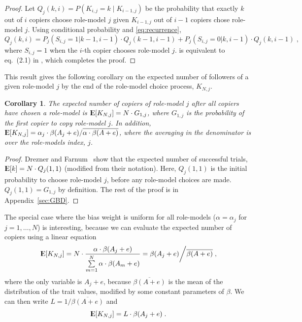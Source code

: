 \documentclass[12pt]{extarticle}
\DeclareMathOperator*{\E}{{\rm I\kern-.3em E}}
\newtheorem{corollary}{Corollary}
\begin{document}
\begin{proof}
{Let} $Q_j(k,i)=P(K_{i,j} = k \mid K_{i-1,j})$ {be} the probability that exactly $k$ out of $i$ copiers choose role-model $j$ given $K_{i-1,j}$ {out} of $i-1$ copiers chose role-model $j$. 
Using conditional probability and \cref{eq:recurrence},
\begin{equation}\label{recursive}
Q_j(k,i) = P_j(S_{i,j}=1 | k-1,i-1) \cdot Q_j(k-1,i-1) + P_j(S_{i,j} =0 | k,i-1) \cdot Q_j(k,i-1) \;,
\end{equation}
where $S_{i,j} =1 $ when the $i$-th copier chooses role-model $j$.
 is equivalent to eq.~(2.1) in \citep{GBD}, which completes the proof.
\end{proof}

This result gives the following corollary on the expected number of followers of a given role-model $j$ by the end of the role-model choice process, $K_{N,j}$.
\\


\begin{corollary}\label{cor:GBD} The expected number of copiers of role-model $j$ after all copiers have chosen a role-model is
$\E[K_{N,j}] = N \cdot G_{1,j}$, where $G_{1,j}$ is the probability of the first copier to copy role-model $j$.
In addition, $\E[K_{N, j}] = \alpha_j \cdot \beta(A_j+e) / \overline{\alpha \cdot \beta(A+e)}$, where the averaging in the denominator is over the role-models index, $j$.
\end{corollary}

\begin{proof}
Drezner and Farnum~\citep[eq.~(2.3)]{GBD} show that the expected number of successful trials, 
$\E[k] = N \cdot Q_j(1,1)$ (modified from their notation). %
Here, $Q_j(1,1)$ is the initial probability to choose role-model $j$, before any role-model choices are made.
$Q_j(1,1) = G_{1,j}$ by definition.
The rest of the proof is in Appendix~\ref{sec:GBD}.
\end{proof}


The special case where the bias weight is uniform for all role-models ($\alpha = \alpha_j$ for $j=1,\ldots, N$) is interesting, because we can evaluate the expected number of copiers using a linear equation
\begin{equation}\label{eq:GBDsamelalpha}
\E[K_{N,j}]= N\cdot\frac{\alpha\cdot\beta(A_j+e)}{\sum\limits_{m=1}^{N}\alpha\cdot\beta(A_m+e)} =\beta(A_j+e) \bigg/ \overline{\beta(A+e)} \;,
\end{equation}
where the only variable is $A_j+e$, because $\overline{\beta(A+e)}$ is the mean of the distribution of the trait values, modified by some constant parameters of $\beta$.
We can then write $L = 1/\overline{\beta(A+e)}$ and
\begin{equation}\label{eq:linearEq}
\E[K_{N,j}] = L\cdot \beta(A_j+e) \;.
\end{equation}
\end{document}
